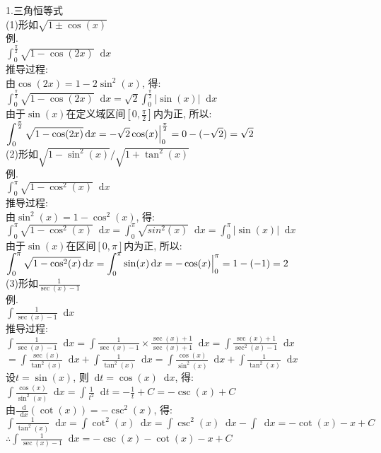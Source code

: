 \documentclass[UTF8, fontset=ubuntu]{ctexart}
\newcommand*{\dif}{\mathop{}\!\mathrm{d}}
\begin{document}
1.三角恒等式\\[1ex]
(1)形如$\sqrt{1\pm\cos(x)}$\\[1ex]
例.\\[1ex]
$\displaystyle\int_0^{\frac{\pi}{2}}\sqrt{1-\cos(2x)}\dif x$\\[1ex]
推导过程:\\[1ex]
由$\cos(2x)=1-2\sin^2(x)$, 得:\\[1ex]
$\displaystyle\int_0^{\frac{\pi}{2}}\sqrt{1-\cos(2x)}\dif x=\sqrt{2}\int_0^{\frac{\pi}{2}}|\sin(x)|\dif x$\\[1ex]
由于$\sin(x)$在定义域区间$[0,\frac{\pi}{2}]$内为正, 所以:\\[1ex]
$\displaystyle\int_0^{\frac{\pi}{2}}\sqrt{1-\cos(2x)}\dif x=-\sqrt{2}\cos(x)\Big{|}_0^{\frac{\pi}{2}}=0-(-\sqrt{2})=\sqrt{2}$\\[1ex]

(2)形如$\sqrt{1-\sin^2(x)}/\sqrt{1+\tan^2(x)}$\\[1ex]
例.\\[1ex]
$\displaystyle\int_0^{\pi}\sqrt{1-\cos^2(x)}\dif x$\\[1ex]
推导过程:\\[1ex]
由$\sin^2(x)=1-\cos^2(x)$, 得:\\[1ex]
$\displaystyle\int_0^{\pi}\sqrt{1-\cos^2(x)}\dif x=\int_0^{\pi}\sqrt{sin^2(x)}\dif x=\int_0^{\pi}|\sin(x)|\dif x$\\[1ex]
由于$\sin(x)$在区间$[0,\pi]$内为正, 所以:\\[1ex]
$\displaystyle\int_0^{\pi}\sqrt{1-\cos^2(x)}\dif x=\int_0^{\pi}\sin(x)\dif x=-\cos(x)\Big{|}_0^{\pi}=1-(-1)=2$\\[1ex]

(3)形如$\displaystyle\frac{1}{\sec(x)-1}$\\[1ex]
例.\\[1ex]
$\displaystyle\int\frac{1}{\sec(x)-1}\dif x$\\[1ex]
推导过程:\\[1ex]
$\displaystyle\int\frac{1}{\sec(x)-1}\dif x=\int\frac{1}{\sec(x)-1}\times\frac{\sec(x)+1}{\sec(x)+1}\dif x=\int\frac{\sec(x)+1}{\sec^2(x)-1}\dif x$\\[1ex]
\phantom{$\displaystyle\int\frac{1}{\sec(x)-1}\dif x$}$\displaystyle=\int\frac{\sec(x)}{\tan^2(x)}\dif x+\int\frac{1}{\tan^2(x)}\dif x=\int\frac{\cos(x)}{\sin^2(x)}\dif x+\int\frac{1}{\tan^2(x)}\dif x$\\[1ex]
设$t=\sin(x)$, 则$\dif t=\cos(x)\dif x$, 得:\\[1ex]
$\displaystyle\int\frac{\cos(x)}{\sin^2(x)}\dif x=\int\frac{1}{t^2}\dif t=-\frac{1}{t}+C=-\csc(x)+C$\\[1ex]
由$\frac{\dif}{\dif x}(\cot(x))=-\csc^2(x)$, 得:\\[1ex]
$\displaystyle\int\frac{1}{\tan^2(x)}\dif x=\int\cot^2(x)\dif x=\int\csc^2(x)\dif x-\int\dif x=-\cot(x)-x+C$\\[1ex]
$\therefore\displaystyle\int\frac{1}{\sec(x)-1}\dif x=-\csc(x)-\cot(x)-x+C$\\[1ex]
\end{document}
